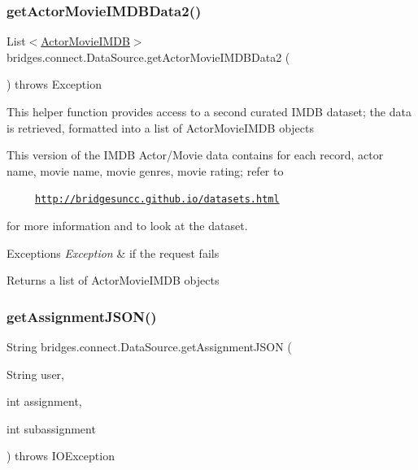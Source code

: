 \subsubsection{\texorpdfstring{get\+Actor\+Movie\+I\+M\+D\+B\+Data2()}{getActorMovieIMDBData2()}}
{\footnotesize\ttfamily List$<$\hyperlink{classbridges_1_1data__src__dependent_1_1_actor_movie_i_m_d_b}{Actor\+Movie\+I\+M\+DB}$>$ bridges.\+connect.\+Data\+Source.\+get\+Actor\+Movie\+I\+M\+D\+B\+Data2 (\begin{DoxyParamCaption}{ }\end{DoxyParamCaption}) throws Exception}

This helper function provides access to a second curated I\+M\+DB dataset; the data is retrieved, formatted into a list of Actor\+Movie\+I\+M\+DB objects

This version of the I\+M\+DB Actor/\+Movie data contains for each record, actor name, movie name, movie genres, movie rating; refer to 

~~~~~\href{http://bridgesuncc.github.io/datasets.html}{\tt http\+://bridgesuncc.\+github.\+io/datasets.\+html} 

for more information and to look at the dataset.


\begin{DoxyExceptions}{Exceptions}
{\em Exception} & if the request fails\\
\hline
\end{DoxyExceptions}
\begin{DoxyReturn}{Returns}
a list of Actor\+Movie\+I\+M\+DB objects 
\end{DoxyReturn}
\mbox{\label{classbridges_1_1connect_1_1_data_source_af2f6cd7172acb64b2ba49f134b5391f8}} 
\subsubsection{\texorpdfstring{get\+Assignment\+J\+S\+O\+N()}{getAssignmentJSON()}\hspace{0.1cm}{\footnotesize\ttfamily [1/2]}}
{\footnotesize\ttfamily String bridges.\+connect.\+Data\+Source.\+get\+Assignment\+J\+S\+ON (\begin{DoxyParamCaption}\item[{String}]{user,  }\item[{int}]{assignment,  }\item[{int}]{subassignment }\end{DoxyParamCaption}) throws I\+O\+Exception}

